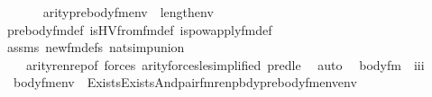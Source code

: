 \begin{isabellebody}
\ \ \isanewline
\ \ \ \ {\isachardoublequoteopen}arity{\isacharparenleft}{\kern0pt}prebody{\isacharunderscore}{\kern0pt}fm{\isacharparenleft}{\kern0pt}{\isasymphi}{\isacharcomma}{\kern0pt}env{\isacharparenright}{\kern0pt}{\isacharparenright}{\kern0pt}{\isasymle}{}\ {\isacharhash}{\kern0pt}{\isacharplus}{\kern0pt}\ length{\isacharparenleft}{\kern0pt}env{\isacharparenright}{\kern0pt}{\isachardoublequoteclose}\isanewline
%
\isadelimproof
\ \ %
\endisadelimproof
%
\isatagproof
{}\isamarkupfalse%
\ prebody{\isacharunderscore}{\kern0pt}fm{\isacharunderscore}{\kern0pt}def\ is{\isacharunderscore}{\kern0pt}HVfrom{\isacharunderscore}{\kern0pt}fm{\isacharunderscore}{\kern0pt}def\ is{\isacharunderscore}{\kern0pt}powapply{\isacharunderscore}{\kern0pt}fm{\isacharunderscore}{\kern0pt}def\isanewline
\ \ \isamarkupfalse%
\ assms\ new{\isacharunderscore}{\kern0pt}fm{\isacharunderscore}{\kern0pt}defs\ nat{\isacharunderscore}{\kern0pt}simp{\isacharunderscore}{\kern0pt}union\isanewline
\ \ \ \ arity{\isacharunderscore}{\kern0pt}renrep{\isacharbrackleft}{\kern0pt}of\ {\isachardoublequoteopen}forces{\isacharparenleft}{\kern0pt}{\isasymphi}{\isacharparenright}{\kern0pt}{\isachardoublequoteclose}{\isacharbrackright}{\kern0pt}\ arity{\isacharunderscore}{\kern0pt}forces{\isacharunderscore}{\kern0pt}le{\isacharbrackleft}{\kern0pt}simplified{\isacharbrackright}{\kern0pt}\ pred{\isacharunderscore}{\kern0pt}le\ \isamarkupfalse%
\ auto%
\endisatagproof
{\isafoldproof}%
%
\isadelimproof
\isanewline
%
\endisadelimproof
\isanewline
\isanewline
{}\isamarkupfalse%
\isanewline
\ \ body{\isacharunderscore}{\kern0pt}fm{\isacharprime}{\kern0pt}\ {\isacharcolon}{\kern0pt}{\isacharcolon}{\kern0pt}\ {\isachardoublequoteopen}{\isacharbrackleft}{\kern0pt}i{\isacharcomma}{\kern0pt}i{\isacharbrackright}{\kern0pt}{\isasymRightarrow}i{\isachardoublequoteclose}\ \isanewline
\ \ {\isachardoublequoteopen}body{\isacharunderscore}{\kern0pt}fm{\isacharprime}{\kern0pt}{\isacharparenleft}{\kern0pt}{\isasymphi}{\isacharcomma}{\kern0pt}env{\isacharparenright}{\kern0pt}\ {\isasymequiv}\ Exists{\isacharparenleft}{\kern0pt}Exists{\isacharparenleft}{\kern0pt}And{\isacharparenleft}{\kern0pt}pair{\isacharunderscore}{\kern0pt}fm{\isacharparenleft}{\kern0pt}{}{\isacharcomma}{\kern0pt}{}{\isacharcomma}{\kern0pt}{}{\isacharparenright}{\kern0pt}{\isacharcomma}{\kern0pt}renpbdy{\isacharparenleft}{\kern0pt}prebody{\isacharunderscore}{\kern0pt}fm{\isacharparenleft}{\kern0pt}{\isasymphi}{\isacharcomma}{\kern0pt}env{\isacharparenright}{\kern0pt}{\isacharcomma}{\kern0pt}env{\isacharparenright}{\kern0pt}{\isacharparenright}{\kern0pt}{\isacharparenright}{\kern0pt}{\isacharparenright}{\kern0pt}{\isachardoublequoteclose}\isanewline

\end{isabellebody}
